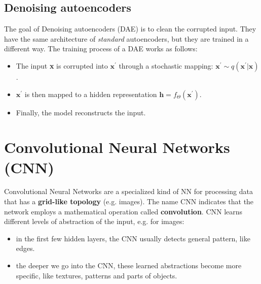 \subsection{Denoising autoencoders}
The goal of Denoising autoencoders (DAE) is to clean the corrupted input. They have the same architecture of \textit{standard} autoencoders, but they are trained in a different way. The training process of a DAE works as follows:
\begin{itemize}
    \item The input \textbf{x} is corrupted into $\textbf{x}^{'}$ through a stochastic mapping: $\textbf{x}^{'} \sim q(\textbf{x}^{'} | \textbf{x})$.

    \item $\textbf{x}^{'}$ is then mapped to a hidden representation $\textbf{h} = f_{\Theta}(\textbf{x}^{'})$.

    \item Finally, the model reconstructs the input.
\end{itemize}

\section{Convolutional Neural Networks (CNN)}
Convolutional Neural Networks are a specialized kind of NN for processing data that has a \textbf{grid-like topology} (e.g. images). The name CNN indicates that the network employs a mathematical operation called \textbf{convolution}.\newline\newline
CNN learns different levels of abstraction of the input, e.g. for images:
\begin{itemize}
    \item in the first few hidden layers, the CNN usually detects general pattern, like edges.

    \item the deeper we go into the CNN, these learned abstractions become more specific, like textures, patterns and parts of objects.

\end{itemize}

